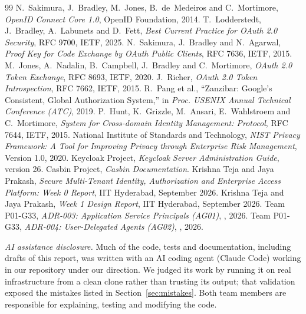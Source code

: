 \begin{thebibliography}{99}
 N.~Sakimura, J.~Bradley, M.~Jones, B.~de~Medeiros and C.~Mortimore, \emph{OpenID Connect Core 1.0}, OpenID Foundation, 2014.
 T.~Lodderstedt, J.~Bradley, A.~Labunets and D.~Fett, \emph{Best Current Practice for OAuth 2.0 Security}, RFC 9700, IETF, 2025.
 N.~Sakimura, J.~Bradley and N.~Agarwal, \emph{Proof Key for Code Exchange by OAuth Public Clients}, RFC 7636, IETF, 2015.
 M.~Jones, A.~Nadalin, B.~Campbell, J.~Bradley and C.~Mortimore, \emph{OAuth 2.0 Token Exchange}, RFC 8693, IETF, 2020.
 J.~Richer, \emph{OAuth 2.0 Token Introspection}, RFC 7662, IETF, 2015.
 R.~Pang et al., ``Zanzibar: Google's Consistent, Global Authorization System,'' in \emph{Proc. USENIX Annual Technical Conference (ATC)}, 2019.
 P.~Hunt, K.~Grizzle, M.~Ansari, E.~Wahlstroem and C.~Mortimore, \emph{System for Cross-domain Identity Management: Protocol}, RFC 7644, IETF, 2015.
 National Institute of Standards and Technology, \emph{NIST Privacy Framework: A Tool for Improving Privacy through Enterprise Risk Management}, Version 1.0, 2020.
 Keycloak Project, \emph{Keycloak Server Administration Guide}, version 26.
 Casbin Project, \emph{Casbin Documentation}.
 Krishna Teja and Jaya Prakash, \emph{Secure Multi-Tenant Identity, Authorization and Enterprise Access Platform: Week 0 Report}, IIT Hyderabad, September 2026.
 Krishna Teja and Jaya Prakash, \emph{Week 1 Design Report}, IIT Hyderabad, September 2026.
 Team P01-G33, \emph{ADR-003: Application Service Principals (AG01)}, , 2026.
 Team P01-G33, \emph{ADR-004: User-Delegated Agents (AG02)}, , 2026.
\end{thebibliography}

\vspace{1em}
\noindent\small\textit{AI assistance disclosure.} Much of the code, tests and documentation, including drafts of this report, was written with an AI coding agent (Claude Code) working in our repository under our direction. We judged its work by running it on real infrastructure from a clean clone rather than trusting its output; that validation exposed the mistakes listed in Section~\ref{sec:mistakes}. Both team members are responsible for explaining, testing and modifying the code.
